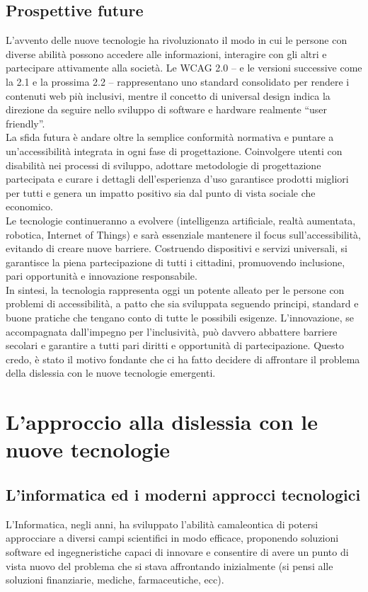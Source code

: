 \documentclass[14pt]{extbook}
\begin{document}
\subsection{Prospettive future}
L’avvento delle nuove tecnologie ha rivoluzionato il modo in cui le persone con diverse abilità possono accedere alle informazioni, interagire con gli altri e partecipare attivamente alla società. Le WCAG 2.0 – e le versioni successive come la 2.1 e la prossima 2.2 – rappresentano uno standard consolidato per rendere i contenuti web più inclusivi, mentre il concetto di universal design indica la direzione da seguire nello sviluppo di software e hardware realmente “user friendly”.\\
La sfida futura è andare oltre la semplice conformità normativa e puntare a un’accessibilità integrata in ogni fase di progettazione. Coinvolgere utenti con disabilità nei processi di sviluppo, adottare metodologie di progettazione partecipata e curare i dettagli dell’esperienza d’uso garantisce prodotti migliori per tutti e genera un impatto positivo sia dal punto di vista sociale che economico.\\
Le tecnologie continueranno a evolvere (intelligenza artificiale, realtà aumentata, robotica, Internet of Things) e sarà essenziale mantenere il focus sull’accessibilità, evitando di creare nuove barriere. Costruendo dispositivi e servizi universali, si garantisce la piena partecipazione di tutti i cittadini, promuovendo inclusione, pari opportunità e innovazione responsabile.\\
In sintesi, la tecnologia rappresenta oggi un potente alleato per le persone con problemi di accessibilità, a patto che sia sviluppata seguendo principi, standard e buone pratiche che tengano conto di tutte le possibili esigenze. L’innovazione, se accompagnata dall’impegno per l’inclusività, può davvero abbattere barriere secolari e garantire a tutti pari diritti e opportunità di partecipazione. Questo credo, è stato il motivo fondante che ci ha fatto decidere di affrontare il problema della dislessia con le nuove tecnologie emergenti.
\pagebreak

\section{L'approccio alla dislessia con le nuove tecnologie}
\subsection{L'informatica ed i moderni approcci tecnologici}
L'Informatica, negli anni, ha sviluppato l'abilità camaleontica di potersi approcciare a diversi campi scientifici in modo efficace, proponendo soluzioni software ed ingegneristiche capaci di innovare e consentire di avere un punto di vista nuovo del problema che si stava affrontando inizialmente (si pensi alle soluzioni finanziarie, mediche, farmaceutiche, ecc).\\
\end{document}
